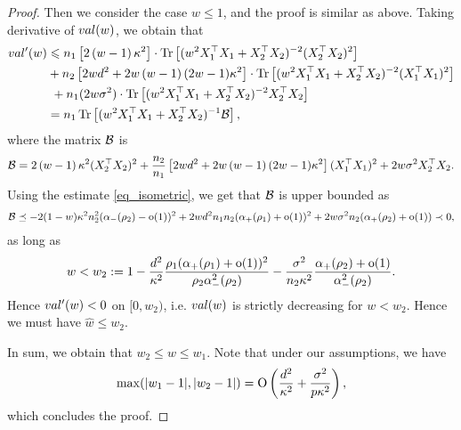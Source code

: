 \begin{proof}
Then we consider the case $w\le 1$, and the proof is similar as above. Taking derivative of $\val(w)$, we obtain that
\begin{align}
	\val'(w) &\le n_1 \left[2\left( w-1\right) \kappa^2\right]\cdot \tr\left[( w^2X_1^{\top}X_1 +X_2^{\top}X_2)^{-2} (X_2^{\top}X_2)^2\right] \nonumber \\
	& + n_2\left[2wd^2 +2w\left( w-1\right)(2w-1)\kappa^2\right]\cdot \tr\left[( w^2X_1^{\top}X_1 +X_2^{\top}X_2)^{-2} (X_1^{\top}X_1)^2\right] \nonumber\\
	&~ + n_1(2 w\sigma^2) \cdot \bigtr{(w^2X_1^{\top}X_1 + X_2^{\top}X_2)^{-2} X_2^\top X_2  }\\
			& = n_1 \bigtr{(w^2X_1^{\top}X_1  + X_2^{\top}X_2)^{-1} \cal B} , \nonumber
\end{align}
where the matrix $\cal B$ is
$$\cal B= 2\left( w-1\right) \kappa^2  (X_2^{\top}X_2)^2+\frac{n_2}{n_1}\left[2wd^2 +2w\left( w-1\right)(2w-1)\kappa^2\right](X_1^{\top}X_1)^2 + 2 w\sigma^2 X_2^\top X_2 .$$
Using the estimate \eqref{eq_isometric}, we get that $\cal B$ is upper bounded as
\begin{align*}
\cal B \preceq - 2(1-w)\kappa^2 n_2^2 (\al_-(\rho_2) -\oo(1))^2 +2w d^2 n_1n_2 (\al_+(\rho_1) +\oo(1))^2 + 2w\sigma^2 n_2 (\al_+(\rho_2)+\oo(1)) \prec 0,
\end{align*}
as long as
$$w< w_2:=1 -   \frac{d^2}{\kappa^2}\frac{\rho_1(\al_+(\rho_1) +\oo(1))^2}{\rho_2 \al_-^2(\rho_2) } -  \frac{\sigma^2}{n_2\kappa^2}\frac{\al_{+}(\rho_2)+\oo(1)}{\al_{-}^2(\rho_2)} .$$
Hence $\val'(w)<0$ on $[0,w_2)$, i.e. $\val(w)$ is strictly decreasing for $w<w_2$. Hence we must have $\hat w\le w_2$. 

In sum, we obtain that $w_2\le w\le w_1$. Note that under our assumptions, we have 
$$\max(|w_1 -1|, |w_2 -1|) =\OO\left(\frac{d^2}{\kappa^2} + \frac{\sigma^2}{p\kappa^2}\right),$$
which concludes the proof.
\end{proof}


